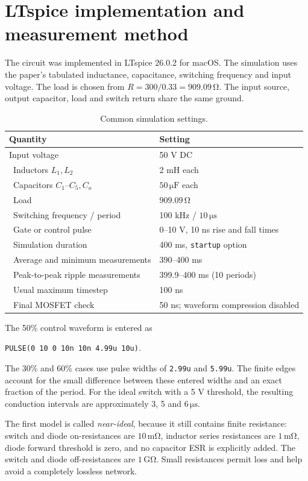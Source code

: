 \documentclass[11pt,a4paper]{article}
\newcommand{\unit}[1]{\,\mathrm{#1}}
\begin{document}
\section{LTspice implementation and measurement method}
The circuit was implemented in LTspice 26.0.2 for macOS. The simulation uses the paper's tabulated inductance, capacitance, switching frequency and input voltage. The load is chosen from $R=300/0.33=909.09\unit{\Omega}$. The input source, output capacitor, load and switch return share the same ground.
\begin{table}[H]\centering\caption{Common simulation settings.}
\begin{tabular}{@{}ll@{}}\toprule
Quantity & Setting \\\midrule
Input voltage & 50 V DC \\\
Inductors $L_1,L_2$ & 2 mH each \\\
Capacitors $C_1$--$C_5,C_o$ & $50\unit{\mu F}$ each \\\
Load & $909.09\unit{\Omega}$ \\\
Switching frequency / period & 100 kHz / $10\unit{\mu s}$ \\\
Gate or control pulse & 0--10 V, 10 ns rise and fall times \\\
Simulation duration & 400 ms, \texttt{startup} option \\\
Average and minimum measurements & 390--400 ms \\\
Peak-to-peak ripple measurements & 399.9--400 ms (10 periods) \\\
Usual maximum timestep & 100 ns \\\
Final MOSFET check & 50 ns; waveform compression disabled \\\bottomrule
\end{tabular}
\end{table}
The 50\% control waveform is entered as
\begin{center}\texttt{PULSE(0 10 0 10n 10n 4.99u 10u)}.\end{center}
The 30\% and 60\% cases use pulse widths of \texttt{2.99u} and \texttt{5.99u}. The finite edges account for the small difference between these entered widths and an exact fraction of the period. For the ideal switch with a 5 V threshold, the resulting conduction intervals are approximately 3, 5 and $6\unit{\mu s}$.

The first model is called \emph{near-ideal}, because it still contains finite resistance: switch and diode on-resistances are $10\unit{m\Omega}$, inductor series resistances are $1\unit{m\Omega}$, diode forward threshold is zero, and no capacitor ESR is explicitly added. The switch and diode off-resistances are $1\unit{G\Omega}$. Small resistances permit loss and help avoid a completely lossless network.
\end{document}
